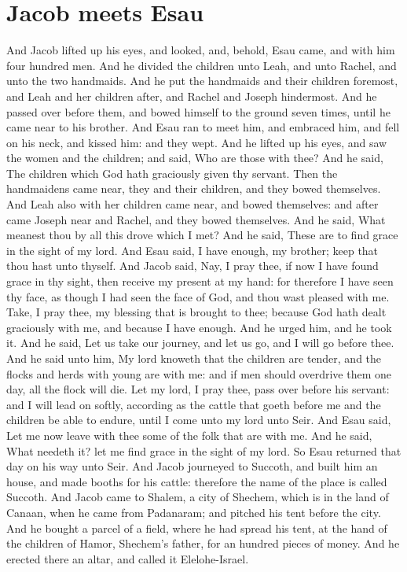 \section*{Jacob meets Esau}
\begin{biblechapter} %
\verse And Jacob lifted up his eyes, and looked, and, behold, Esau came, and with him four hundred men. And he divided the children unto Leah, and unto Rachel, and unto the two handmaids.
\verse And he put the handmaids and their children foremost, and Leah and her children after, and Rachel and Joseph hindermost.
\verse And he passed over before them, and bowed himself to the ground seven times, until he came near to his brother.
\verse And Esau ran to meet him, and embraced him, and fell on his neck, and kissed him: and they wept.
\verse And he lifted up his eyes, and saw the women and the children; and said, Who are those with thee? And he said, The children which God hath graciously given thy servant.
\verse Then the handmaidens came near, they and their children, and they bowed themselves.
\verse And Leah also with her children came near, and bowed themselves: and after came Joseph near and Rachel, and they bowed themselves.
\verse And he said, What meanest thou by all this drove which I met? And he said, These are to find grace in the sight of my lord.
\verse And Esau said, I have enough, my brother; keep that thou hast unto thyself.
\verse And Jacob said, Nay, I pray thee, if now I have found grace in thy sight, then receive my present at my hand: for therefore I have seen thy face, as though I had seen the face of God, and thou wast pleased with me.
\verse Take, I pray thee, my blessing that is brought to thee; because God hath dealt graciously with me, and because I have enough. And he urged him, and he took it.
\verse And he said, Let us take our journey, and let us go, and I will go before thee.
\verse And he said unto him, My lord knoweth that the children are tender, and the flocks and herds with young are with me: and if men should overdrive them one day, all the flock will die.
\verse Let my lord, I pray thee, pass over before his servant: and I will lead on softly, according as the cattle that goeth before me and the children be able to endure, until I come unto my lord unto Seir.
\verse And Esau said, Let me now leave with thee some of the folk that are with me. And he said, What needeth it? let me find grace in the sight of my lord.
\verse So Esau returned that day on his way unto Seir.
\verse And Jacob journeyed to Succoth, and built him an house, and made booths for his cattle: therefore the name of the place is called Succoth.
\verse And Jacob came to Shalem, a city of Shechem, which is in the land of Canaan, when he came from Padanaram; and pitched his tent before the city.
\verse And he bought a parcel of a field, where he had spread his tent, at the hand of the children of Hamor, Shechem's father, for an hundred pieces of money.
\verse And he erected there an altar, and called it Elelohe-Israel.
\end{biblechapter}

